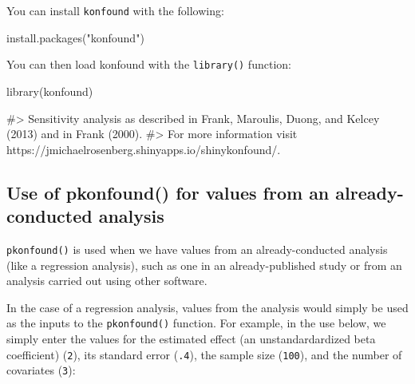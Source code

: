 You can install \texttt{konfound} with the following:

\begin{Schunk}
\begin{Sinput}
install.packages("konfound")
\end{Sinput}
\end{Schunk}

You can then load konfound with the \texttt{library()} function:

\begin{Schunk}
\begin{Sinput}
library(konfound)
\end{Sinput}
\begin{Soutput}
#> Sensitivity analysis as described in Frank, Maroulis, Duong, and Kelcey (2013) and in Frank (2000).
#> For more information visit https://jmichaelrosenberg.shinyapps.io/shinykonfound/.
\end{Soutput}
\end{Schunk}

\hypertarget{use-of-pkonfound-for-values-from-an-already-conducted-analysis}{%
\subsection{Use of pkonfound() for values from an already-conducted
analysis}\label{use-of-pkonfound-for-values-from-an-already-conducted-analysis}}

\texttt{pkonfound()} is used when we have values from an
already-conducted analysis (like a regression analysis), such as one in
an already-published study or from an analysis carried out using other
software.

In the case of a regression analysis, values from the analysis would
simply be used as the inputs to the \texttt{pkonfound()} function. For
example, in the use below, we simply enter the values for the estimated
effect (an unstandardardized beta coefficient) (\texttt{2}), its
standard error (\texttt{.4}), the sample size (\texttt{100}), and the
number of covariates (\texttt{3}):

